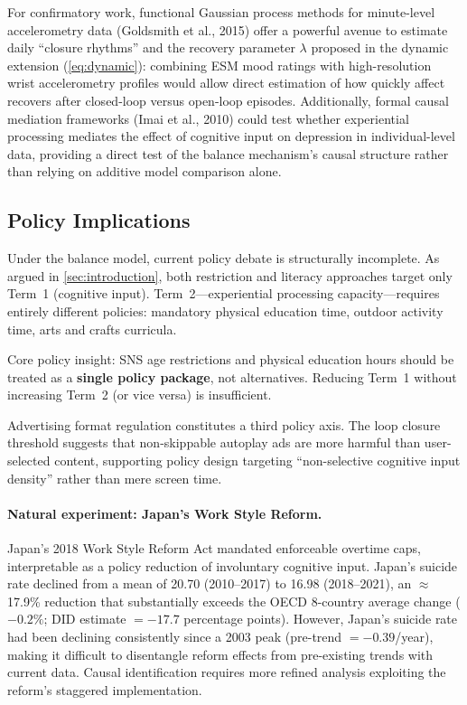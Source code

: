 \documentclass[a4paper,11pt,titlepage]{article}
\begin{document}
For confirmatory work, functional Gaussian process methods for minute-level accelerometry data (Goldsmith et al., 2015) offer a powerful avenue to estimate daily ``closure rhythms'' and the recovery parameter $\lambda$ proposed in the dynamic extension (\cref{eq:dynamic}): combining ESM mood ratings with high-resolution wrist accelerometry profiles would allow direct estimation of how quickly affect recovers after closed-loop versus open-loop episodes. Additionally, formal causal mediation frameworks (Imai et al., 2010) could test whether experiential processing mediates the effect of cognitive input on depression in individual-level data, providing a direct test of the balance mechanism's causal structure rather than relying on additive model comparison alone.


\subsection{Policy Implications}

Under the balance model, current policy debate is structurally incomplete. As argued in \cref{sec:introduction}, both restriction and literacy approaches target only Term~1 (cognitive input). Term~2---experiential processing capacity---requires entirely different policies: mandatory physical education time, outdoor activity time, arts and crafts curricula.

Core policy insight: SNS age restrictions and physical education hours should be treated as a \textbf{single policy package}, not alternatives. Reducing Term~1 without increasing Term~2 (or vice versa) is insufficient.

Advertising format regulation constitutes a third policy axis. The loop closure threshold suggests that non-skippable autoplay ads are more harmful than user-selected content, supporting policy design targeting ``non-selective cognitive input density'' rather than mere screen time.

\paragraph{Natural experiment: Japan's Work Style Reform.}
Japan's 2018 Work Style Reform Act mandated enforceable overtime caps, interpretable as a policy reduction of involuntary cognitive input. Japan's suicide rate declined from a mean of 20.70 (2010--2017) to 16.98 (2018--2021), an $\approx$17.9\% reduction that substantially exceeds the OECD 8-country average change ($-0.2\%$; DID estimate $= -17.7$ percentage points). However, Japan's suicide rate had been declining consistently since a 2003 peak (pre-trend $= -0.39$/year), making it difficult to disentangle reform effects from pre-existing trends with current data. Causal identification requires more refined analysis exploiting the reform's staggered implementation.
\end{document}

